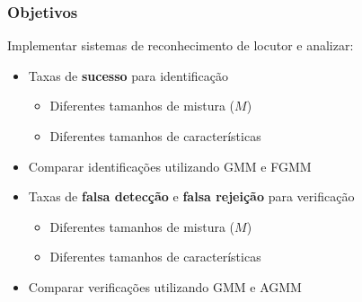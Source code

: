 \begin{frame}
\frametitle{Objetivos}
\begin{description}
    \item Implementar sistemas de reconhecimento de locutor e analizar:
    \pause
    \begin{itemize}
        \item Taxas de \textbf{sucesso} para identificação
        \pause
        \begin{itemize}
            \item Diferentes tamanhos de mistura ($M$)
            \pause
            \item Diferentes tamanhos de características
            \pause
        \end{itemize}
        \item Comparar identificações utilizando GMM e FGMM
        \pause
        \item Taxas de \textbf{falsa detecção} e \textbf{falsa rejeição} para verificação
        \pause
        \begin{itemize}
            \item Diferentes tamanhos de mistura ($M$)
            \pause
            \item Diferentes tamanhos de características
            \pause
        \end{itemize}
        \item Comparar verificações utilizando GMM e AGMM
    \end{itemize}
\end{description}
\end{frame}